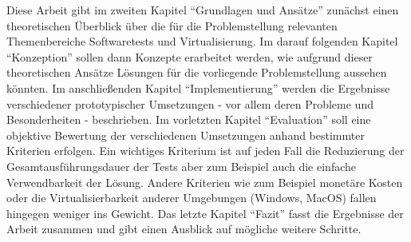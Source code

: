 Diese Arbeit gibt im zweiten Kapitel "`Grundlagen und Ansätze"' zunächst einen theoretischen Überblick über die für die Problemstellung relevanten Themenbereiche Softwaretests und Virtualisierung. Im darauf folgenden Kapitel "`Konzeption"' sollen dann Konzepte erarbeitet werden, wie aufgrund dieser theoretischen Ansätze Lösungen für die vorliegende Problemstellung aussehen könnten. Im anschließenden Kapitel "`Implementierung"' werden die Ergebnisse verschiedener prototypischer Umsetzungen - vor allem deren Probleme und Besonderheiten - beschrieben. Im vorletzten Kapitel "`Evaluation"' soll eine objektive Bewertung der verschiedenen Umsetzungen anhand bestimmter Kriterien erfolgen. Ein wichtiges Kriterium ist auf jeden Fall die Reduzierung der Gesamtausführungsdauer der Tests aber zum Beispiel auch die einfache Verwendbarkeit der Lösung. Andere Kriterien wie zum Beispiel monetäre Kosten oder die Virtualisierbarkeit anderer Umgebungen (Windows, MacOS) fallen hingegen weniger ins Gewicht. Das letzte Kapitel "`Fazit"' fasst die Ergebnisse der Arbeit zusammen und gibt einen Ausblick auf mögliche weitere Schritte.

